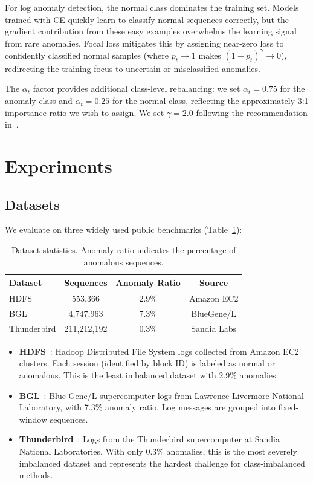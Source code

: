 \documentclass[conference]{IEEEtran}
\begin{document}
For log anomaly detection, the normal class dominates the training set.
Models trained with CE quickly learn to classify normal sequences correctly,
but the gradient contribution from these easy examples overwhelms the learning signal
from rare anomalies.
Focal loss mitigates this by assigning near-zero loss to confidently classified normal samples
(where $p_t \to 1$ makes $(1 - p_t)^\gamma \to 0$),
redirecting the training focus to uncertain or misclassified anomalies.

The $\alpha_t$ factor provides additional class-level rebalancing:
we set $\alpha_t = 0.75$ for the anomaly class and $\alpha_t = 0.25$ for the normal class,
reflecting the approximately 3:1 importance ratio we wish to assign.
We set $\gamma = 2.0$ following the recommendation in~\cite{lin2017focal}.

\section{Experiments}\label{sec:experiments}

\subsection{Datasets}\label{sec:datasets}

We evaluate on three widely used public benchmarks (Table~\ref{tab:datasets}):

\begin{table}[t]
\centering
\caption{Dataset statistics. Anomaly ratio indicates the percentage of anomalous sequences.}
\label{tab:datasets}
\small
\begin{tabular}{lccc}
\toprule
\textbf{Dataset} & \textbf{Sequences} & \textbf{Anomaly Ratio} & \textbf{Source} \\
\midrule
HDFS & 553,366 & 2.9\% & Amazon EC2 \\
BGL & 4,747,963 & 7.3\% & BlueGene/L \\
Thunderbird & 211,212,192 & 0.3\% & Sandia Labs \\
\bottomrule
\end{tabular}
\end{table}

\begin{itemize}
    \item \textbf{HDFS}~\cite{xu2009detecting}: Hadoop Distributed File System logs collected from Amazon EC2 clusters. Each session (identified by block ID) is labeled as normal or anomalous. This is the least imbalanced dataset with 2.9\% anomalies.
    \item \textbf{BGL}~\cite{oliner2007supercomputers}: Blue Gene/L supercomputer logs from Lawrence Livermore National Laboratory, with 7.3\% anomaly ratio. Log messages are grouped into fixed-window sequences.
    \item \textbf{Thunderbird}~\cite{oliner2007supercomputers}: Logs from the Thunderbird supercomputer at Sandia National Laboratories. With only 0.3\% anomalies, this is the most severely imbalanced dataset and represents the hardest challenge for class-imbalanced methods.
\end{itemize}
\end{document}
